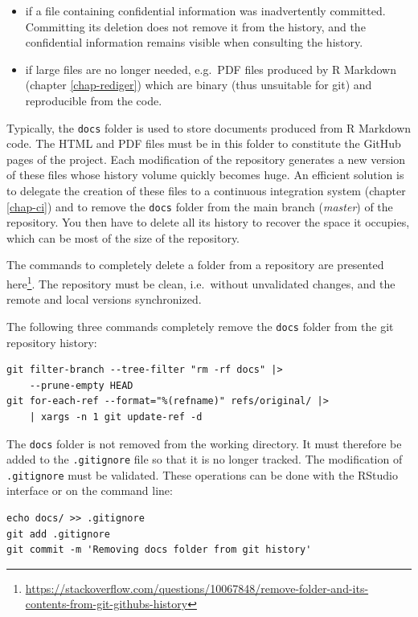\documentclass[
  12pt,
  american,
  a4paper,
  extrafontsizes,onecolumn,openright
  ]{memoir}
\providecommand{\tightlist}{%
  \setlength{\itemsep}{0pt}\setlength{\parskip}{0pt}}
\newlength{\rf}
\begin{document}
\begin{itemize}
\tightlist
\item
  if a file containing confidential information was inadvertently committed.
  Committing its deletion does not remove it from the history, and the confidential information remains visible when consulting the history.
\item
  if large files are no longer needed, e.g.~PDF files produced by R Markdown (chapter \ref{chap-rediger}) which are binary (thus unsuitable for git) and reproducible from the code.
\end{itemize}

Typically, the \texttt{docs} folder is used to store documents produced from R Markdown code.
The HTML and PDF files must be in this folder to constitute the GitHub pages of the project.
Each modification of the repository generates a new version of these files whose history volume quickly becomes huge.
An efficient solution is to delegate the creation of these files to a continuous integration system (chapter \ref{chap-ci}) and to remove the \texttt{docs} folder from the main branch (\emph{master}) of the repository.
You then have to delete all its history to recover the space it occupies, which can be most of the size of the repository.

The commands to completely delete a folder from a repository are presented here\footnote{\url{https://stackoverflow.com/questions/10067848/remove-folder-and-its-contents-from-git-githubs-history}}.
The repository must be clean, i.e.~without unvalidated changes, and the remote and local versions synchronized.

The following three commands completely remove the \texttt{docs} folder from the git repository history:

\begin{verbatim}
git filter-branch --tree-filter "rm -rf docs" |>
    --prune-empty HEAD
git for-each-ref --format="%(refname)" refs/original/ |>
    | xargs -n 1 git update-ref -d
\end{verbatim}

The \texttt{docs} folder is not removed from the working directory.
It must therefore be added to the \texttt{.gitignore} file so that it is no longer tracked.
The modification of \texttt{.gitignore} must be validated.
These operations can be done with the RStudio interface or on the command line:

\begin{verbatim}
echo docs/ >> .gitignore
git add .gitignore
git commit -m 'Removing docs folder from git history'
\end{verbatim}
\end{document}
